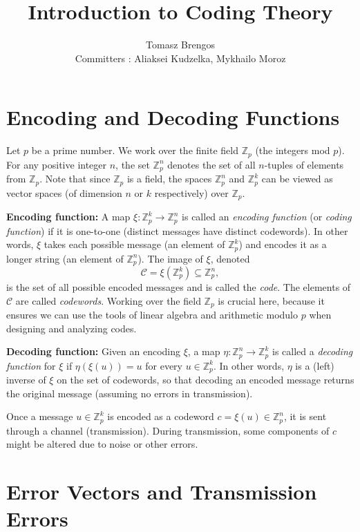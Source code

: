 \documentclass[docmute]{article}
\title{Introduction to Coding Theory}
\author{Tomasz Brengos \\  
Committers : Aliaksei Kudzelka, Mykhailo Moroz}
\date{}
\begin{document}
\maketitle


\section{Encoding and Decoding Functions}

Let $p$ be a prime number. We work over the finite field $\mathbb{Z}_p$ (the integers mod $p$). For any positive integer $n$, the set $\mathbb{Z}_p^n$ denotes the set of all $n$-tuples of elements from $\mathbb{Z}_p$. Note that since $\mathbb{Z}_p$ is a field, the spaces $\mathbb{Z}_p^n$ and $\mathbb{Z}_p^k$ can be viewed as vector spaces (of dimension $n$ or $k$ respectively) over $\mathbb{Z}_p$.

\medskip

\noindent \textbf{Encoding function:} A map $\xi: \mathbb{Z}_p^k \to \mathbb{Z}_p^n$ is called an \emph{encoding function} (or \emph{coding function}) if it is one-to-one (distinct messages have distinct codewords). In other words, $\xi$ takes each possible message (an element of $\mathbb{Z}_p^k$) and encodes it as a longer string (an element of $\mathbb{Z}_p^n$). The image of $\xi$, denoted 
\[ \mathcal{C} = \xi(\mathbb{Z}_p^k) \subseteq \mathbb{Z}_p^n, \] 
is the set of all possible encoded messages and is called the \emph{code}. The elements of $\mathcal{C}$ are called \emph{codewords}. Working over the field $\mathbb{Z}_p$ is crucial here, because it ensures we can use the tools of linear algebra and arithmetic modulo $p$ when designing and analyzing codes.

\medskip

\noindent \textbf{Decoding function:} Given an encoding $\xi$, a map $\eta: \mathbb{Z}_p^n \to \mathbb{Z}_p^k$ is called a \emph{decoding function} for $\xi$ if $\eta(\xi(u)) = u$ for every $u \in \mathbb{Z}_p^k$. In other words, $\eta$ is a (left) inverse of $\xi$ on the set of codewords, so that decoding an encoded message returns the original message (assuming no errors in transmission).

\medskip

Once a message $u \in \mathbb{Z}_p^k$ is encoded as a codeword $c = \xi(u) \in \mathbb{Z}_p^n$, it is sent through a channel (transmission). During transmission, some components of $c$ might be altered due to noise or other errors.

\section{Error Vectors and Transmission Errors}
\end{document}
